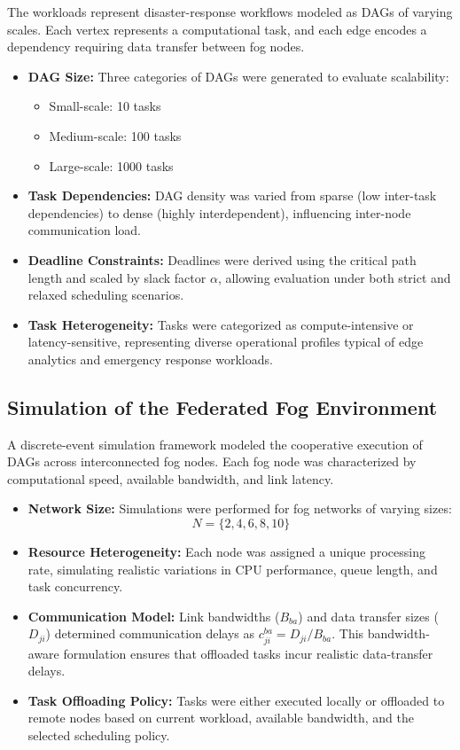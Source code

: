 \documentclass[conference]{IEEEtran}
\begin{document}
The workloads represent disaster-response workflows modeled as DAGs of varying scales. Each vertex represents a computational task, and each edge encodes a dependency requiring data transfer between fog nodes.
\begin{itemize}
    \item \textbf{DAG Size:}  
    Three categories of DAGs were generated to evaluate scalability:
    \begin{itemize}
        \item Small-scale: 10 tasks
        \item Medium-scale: 100 tasks
        \item Large-scale: 1000 tasks
    \end{itemize}
    \item \textbf{Task Dependencies:}  
    DAG density was varied from sparse (low inter-task dependencies) to dense (highly interdependent), influencing inter-node communication load.
    \item \textbf{Deadline Constraints:}  
    Deadlines were derived using the critical path length and scaled by slack factor $\alpha$, allowing evaluation under both strict and relaxed scheduling scenarios.
    \item \textbf{Task Heterogeneity:}  
    Tasks were categorized as compute-intensive or latency-sensitive, representing diverse operational profiles typical of edge analytics and emergency response workloads.
\end{itemize}

\subsection{Simulation of the Federated Fog Environment}

A discrete-event simulation framework modeled the cooperative execution of DAGs across interconnected fog nodes. Each fog node was characterized by computational speed, available bandwidth, and link latency. 
\begin{itemize}
    \item \textbf{Network Size:}  
    Simulations were performed for fog networks of varying sizes:
    \[
    N = \{2, 4, 6, 8, 10\}
    \]
    \item \textbf{Resource Heterogeneity:}  
    Each node was assigned a unique processing rate, simulating realistic variations in CPU performance, queue length, and task concurrency.
    \item \textbf{Communication Model:}  
    Link bandwidths ($B_{ba}$) and data transfer sizes ($D_{ji}$) determined communication delays as $c_{ji}^{ba} = D_{ji}/B_{ba}$.  
    This bandwidth-aware formulation ensures that offloaded tasks incur realistic data-transfer delays.
    \item \textbf{Task Offloading Policy:}  
    Tasks were either executed locally or offloaded to remote nodes based on current workload, available bandwidth, and the selected scheduling policy.
\end{itemize}
\end{document}
